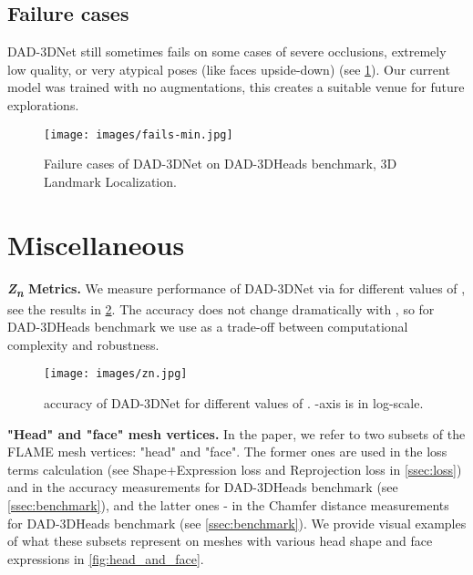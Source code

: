 \documentclass[10pt,twocolumn,letterpaper]{article}
\begin{document}
\subsection{Failure cases}
DAD-3DNet still sometimes fails on some cases of severe occlusions, extremely low quality, or very atypical poses (like faces upside-down) (see \cref{fig:fails-lnmd}). Our current model was trained with no augmentations, this creates a suitable venue for future explorations.

\begin{figure}[h]\centering
\texttt{[image: images/fails-min.jpg]}
  \caption{Failure cases of DAD-3DNet on DAD-3DHeads benchmark, 3D Landmark Localization.}
  \vspace{-1em}
  \label{fig:fails-lnmd}
\end{figure}






\section{Miscellaneous}

\textbf{\textit{Z\textsubscript{n}} Metrics.}
We measure performance of DAD-3DNet via  for different values of , see the results in \cref{fig:z5}. The accuracy does not change dramatically with , so for DAD-3DHeads benchmark we use  as a trade-off between computational complexity and robustness.

\begin{figure}[h]\centering
\texttt{[image: images/zn.jpg]}
  \caption{ accuracy of DAD-3DNet for different values of . -axis is in log-scale.}
  \vspace{-1em}
  \label{fig:z5}
\end{figure}

\bigskip

\textbf{"Head" and "face" mesh vertices.} In the paper, we refer to two subsets of the FLAME mesh vertices: "head" and "face". 
The former ones are used in the loss terms calculation (see Shape+Expression loss and Reprojection loss in \cref{ssec:loss}) and in the  accuracy measurements for DAD-3DHeads benchmark (see \cref{ssec:benchmark}), and the latter ones - in the Chamfer distance measurements for DAD-3DHeads benchmark (see \cref{ssec:benchmark}). 
We provide visual examples of what these subsets represent on meshes with various head shape and face expressions in \cref{fig:head_and_face}.
\end{document}
